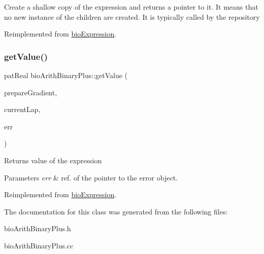 Create a shallow copy of the expression and returns a pointer to it. It means that no new instance of the children are created. It is typically called by the repository 

Reimplemented from \hyperlink{classbio_expression_a442534762693b92baaf33928979a1bf8}{bio\+Expression}.

\mbox{\label{classbio_arith_binary_plus_a40a7b6945cd9118f110e580ab90c7b5f}} 
\subsubsection{\texorpdfstring{get\+Value()}{getValue()}}
{\footnotesize\ttfamily pat\+Real bio\+Arith\+Binary\+Plus\+::get\+Value (\begin{DoxyParamCaption}\item[{pat\+Boolean}]{prepare\+Gradient,  }\item[{pat\+U\+Long}]{current\+Lap,  }\item[{pat\+Error $\ast$\&}]{err }\end{DoxyParamCaption})\hspace{0.3cm}{\ttfamily [virtual]}}

\begin{DoxyReturn}{Returns}
value of the expression 
\end{DoxyReturn}

\begin{DoxyParams}{Parameters}
{\em err} & ref. of the pointer to the error object. \\
\hline
\end{DoxyParams}


Reimplemented from \hyperlink{classbio_expression_af58662a5d4d456f15bc4f2c9bd4f8a5b}{bio\+Expression}.



The documentation for this class was generated from the following files\+:\begin{DoxyCompactItemize}
\item 
bio\+Arith\+Binary\+Plus.\+h\item 
bio\+Arith\+Binary\+Plus.\+cc\end{DoxyCompactItemize}
